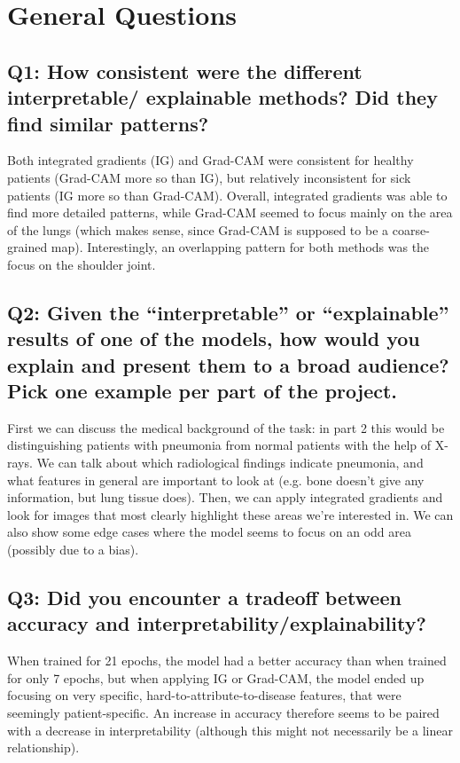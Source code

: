 \section*{General Questions}

\subsection*{Q1: How consistent were the different interpretable/ explainable methods? Did they find similar patterns?}
Both integrated gradients (IG) and Grad-CAM were consistent for healthy patients (Grad-CAM more so than IG), but relatively inconsistent for sick patients (IG more so than Grad-CAM). Overall, integrated gradients was able to find more detailed patterns, while Grad-CAM seemed to focus mainly on the area of the lungs (which makes sense, since Grad-CAM is supposed to be a coarse-grained map). Interestingly, an overlapping pattern for both methods was the focus on the shoulder joint.

\subsection*{Q2: Given the “interpretable” or “explainable” results of one of the models, how would you explain and present them to a broad audience? Pick one example per part of the project.}
First we can discuss the medical background of the task: in part 2 this would be distinguishing patients with pneumonia from normal patients with the help of X-rays. We can talk about which radiological findings indicate pneumonia, and what features in general are important to look at (e.g. bone doesn't give any information, but lung tissue does).
Then, we can apply integrated gradients and look for images that most clearly highlight these areas we're interested in. We can also show some edge cases where the model seems to focus on an odd area (possibly due to a bias).


\subsection*{Q3: Did you encounter a tradeoff between accuracy and interpretability/explainability?}
When trained for 21 epochs, the model had a better accuracy than when trained for only 7 epochs, but when applying IG or Grad-CAM, the model ended up focusing on very specific, hard-to-attribute-to-disease features, that were seemingly patient-specific. An increase in accuracy therefore seems to be paired with a decrease in interpretability (although this might not necessarily be a linear relationship).

